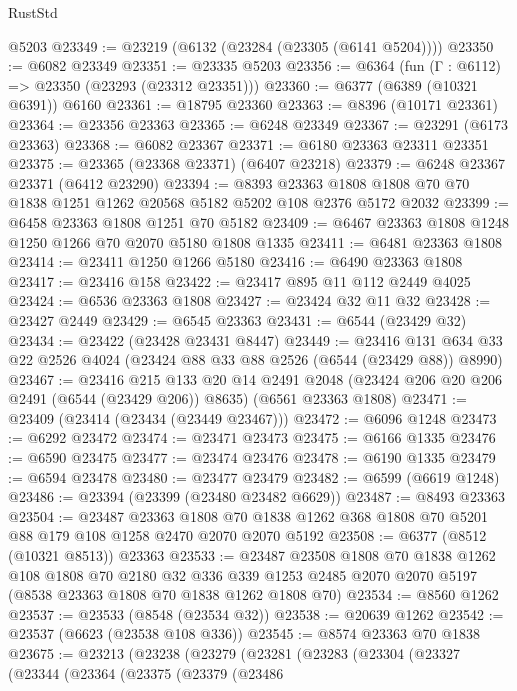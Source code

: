 \begin{lexlean}{RustStd}
\begin{coremodule}
    @5203
@23349 := @23219 (@6132 (@23284 (@23305 (@6141 @5204))))
@23350 := @6082 @23349
@23351 := @23335 @5203
@23356 := @6364 (fun (Γ : @6112) => @23350 (@23293 (@23312 @23351)))
@23360 := @6377 (@6389 (@10321 @6391)) @6160
@23361 := @18795 @23360
@23363 := @8396 (@10171 @23361)
@23364 := @23356 @23363
@23365 := @6248 @23349
@23367 := @23291 (@6173 @23363)
@23368 := @6082 @23367
@23371 := @6180 @23363 @23311 @23351
@23375 := @23365 (@23368 @23371) (@6407 @23218)
@23379 := @6248 @23367 @23371 (@6412 @23290)
@23394 := @8393
    @23363
    @1808
    @1808
    @70
    @70
    @1838
    @1251
    @1262
    @20568
    @5182
    @5202
    @108
    @2376
    @5172
    @2032
@23399 := @6458 @23363 @1808 @1251 @70 @5182
@23409 := @6467 @23363 @1808 @1248 @1250 @1266 @70 @2070 @5180 @1808 @1335
@23411 := @6481 @23363 @1808
@23414 := @23411 @1250 @1266 @5180
@23416 := @6490 @23363 @1808
@23417 := @23416 @158
@23422 := @23417 @895 @11 @112 @2449 @4025
@23424 := @6536 @23363 @1808
@23427 := @23424 @32 @11 @32
@23428 := @23427 @2449
@23429 := @6545 @23363
@23431 := @6544 (@23429 @32)
@23434 := @23422 (@23428 @23431 @8447)
@23449 := @23416 @131 @634 @33 @22 @2526 @4024 (@23424 @88 @33 @88 @2526 (@6544 (@23429 @88)) @8990)
@23467 := @23416
    @215
    @133
    @20
    @14
    @2491
    @2048
    (@23424 @206 @20 @206 @2491 (@6544 (@23429 @206)) @8635)
    (@6561 @23363 @1808)
@23471 := @23409 (@23414 (@23434 (@23449 @23467)))
@23472 := @6096 @1248
@23473 := @6292 @23472
@23474 := @23471 @23473
@23475 := @6166 @1335
@23476 := @6590 @23475
@23477 := @23474 @23476
@23478 := @6190 @1335
@23479 := @6594 @23478
@23480 := @23477 @23479
@23482 := @6599 (@6619 @1248)
@23486 := @23394 (@23399 (@23480 @23482 @6629))
@23487 := @8493 @23363
@23504 := @23487
    @23363
    @1808
    @70
    @1838
    @1262
    @368
    @1808
    @70
    @5201
    @88
    @179
    @108
    @1258
    @2470
    @2070
    @2070
    @5192
@23508 := @6377 (@8512 (@10321 @8513)) @23363
@23533 := @23487
    @23508
    @1808
    @70
    @1838
    @1262
    @108
    @1808
    @70
    @2180
    @32
    @336
    @339
    @1253
    @2485
    @2070
    @2070
    @5197
    (@8538 @23363 @1808 @70 @1838 @1262 @1808 @70)
@23534 := @8560 @1262
@23537 := @23533 (@8548 (@23534 @32))
@23538 := @20639 @1262
@23542 := @23537 (@6623 (@23538 @108 @336))
@23545 := @8574 @23363 @70 @1838
@23675 := @23213
    (@23238
      (@23279
        (@23281
          (@23283
            (@23304
              (@23327
                (@23344
                  (@23364
                    (@23375
                      (@23379
                        (@23486

\end{coremodule}
\end{lexlean}
